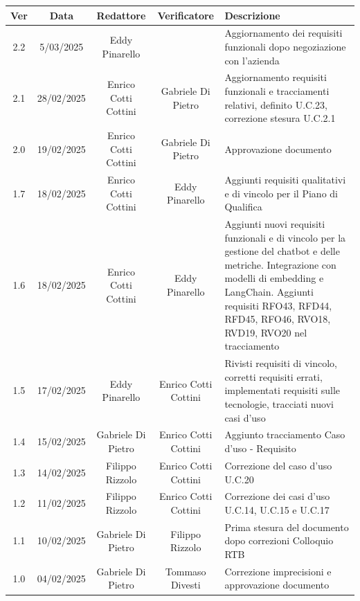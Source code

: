\documentclass{article}
\begin{document}
\newpage
\begin{table}[h]
    \centering
    \renewcommand{\arraystretch}{1.2}
    \setlength{\tabcolsep}{5pt}
    \begin{tabular}{|c|c|c|c|m{}|}
        \hline
        \textbf{Ver} & \textbf{Data} & \textbf{Redattore} & \textbf{Verificatore} & \textbf{Descrizione} \\
        \hline
        2.2 & 5/03/2025 & Eddy Pinarello &  & Aggiornamento dei requisiti funzionali dopo negoziazione con l'azienda \\
        \hline
        2.1 & 28/02/2025 & Enrico Cotti Cottini & Gabriele Di Pietro &  Aggiornamento requisiti funzionali e tracciamenti relativi, definito U.C.23, correzione stesura U.C.2.1 \\
        \hline
        2.0 & 19/02/2025 & Enrico Cotti Cottini & Gabriele Di Pietro & Approvazione documento  \\
        \hline
        1.7 & 18/02/2025 & Enrico Cotti Cottini & Eddy Pinarello & Aggiunti requisiti qualitativi e di vincolo per il Piano di Qualifica \\
        \hline
        1.6 & 18/02/2025 & Enrico Cotti Cottini & Eddy Pinarello & Aggiunti nuovi requisiti funzionali e di vincolo per la gestione del chatbot e delle metriche. Integrazione con modelli di embedding e LangChain. Aggiunti requisiti RFO43, RFD44, RFD45, RFO46, RVO18, RVD19, RVO20 nel tracciamento \\
        \hline
        1.5 & 17/02/2025 & Eddy Pinarello & Enrico Cotti Cottini & Rivisti requisiti di vincolo, corretti requisiti errati, implementati requisiti sulle tecnologie, tracciati nuovi casi d'uso \\
        \hline
        1.4 & 15/02/2025 & Gabriele Di Pietro & Enrico Cotti Cottini & Aggiunto tracciamento Caso d'uso - Requisito \\
        \hline
        1.3 & 14/02/2025 & Filippo Rizzolo & Enrico Cotti Cottini & Correzione del caso d'uso U.C.20 \\
        \hline
        1.2 & 11/02/2025 & Filippo Rizzolo & Enrico Cotti Cottini & Correzione dei casi d'uso U.C.14, U.C.15 e U.C.17 \\
        \hline
        1.1 & 10/02/2025 & Gabriele Di Pietro & Filippo Rizzolo & Prima stesura del documento dopo correzioni Colloquio RTB \\
        \hline
        1.0 & 04/02/2025 & Gabriele Di Pietro & Tommaso Divesti & Correzione imprecisioni e approvazione documento \\

\end{tabular}
\end{table}
\end{document}
